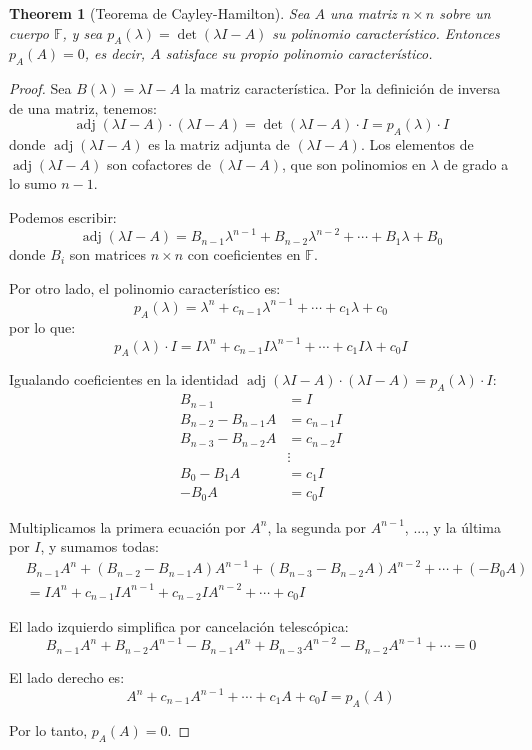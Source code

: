 \documentclass[11pt,a4paper]{article}
\theoremstyle{plain}
\newtheorem{theorem}{Theorem}[section]
\theoremstyle{definition}
\begin{document}
\begin{theorem}[Teorema de Cayley-Hamilton]
Sea $A$ una matriz $n \times n$ sobre un cuerpo $\mathbb{F}$, y sea $p_A(\lambda) = \det(\lambda I - A)$ su polinomio característico. Entonces $p_A(A) = 0$, es decir, $A$ satisface su propio polinomio característico.
\end{theorem}

\begin{proof}
Sea $B(\lambda) = \lambda I - A$ la matriz característica. Por la definición de inversa de una matriz, tenemos:
\[
\operatorname{adj}(\lambda I - A) \cdot (\lambda I - A) = \det(\lambda I - A) \cdot I = p_A(\lambda) \cdot I
\]
donde $\operatorname{adj}(\lambda I - A)$ es la matriz adjunta de $(\lambda I - A)$. Los elementos de $\operatorname{adj}(\lambda I - A)$ son cofactores de $(\lambda I - A)$, que son polinomios en $\lambda$ de grado a lo sumo $n-1$.

Podemos escribir:
\[
\operatorname{adj}(\lambda I - A) = B_{n-1} \lambda^{n-1} + B_{n-2} \lambda^{n-2} + \cdots + B_1 \lambda + B_0
\]
donde $B_i$ son matrices $n \times n$ con coeficientes en $\mathbb{F}$.

Por otro lado, el polinomio característico es:
\[
p_A(\lambda) = \lambda^n + c_{n-1} \lambda^{n-1} + \cdots + c_1 \lambda + c_0
\]
por lo que:
\[
p_A(\lambda) \cdot I = I \lambda^n + c_{n-1} I \lambda^{n-1} + \cdots + c_1 I \lambda + c_0 I
\]

Igualando coeficientes en la identidad $\operatorname{adj}(\lambda I - A) \cdot (\lambda I - A) = p_A(\lambda) \cdot I$:
\begin{align*}
B_{n-1} &= I \\
B_{n-2} - B_{n-1} A &= c_{n-1} I \\
B_{n-3} - B_{n-2} A &= c_{n-2} I \\
&\vdots \\
B_0 - B_1 A &= c_1 I \\
-B_0 A &= c_0 I
\end{align*}

Multiplicamos la primera ecuación por $A^n$, la segunda por $A^{n-1}$, ..., y la última por $I$, y sumamos todas:
\begin{align*}
&B_{n-1} A^n + (B_{n-2} - B_{n-1} A) A^{n-1} + (B_{n-3} - B_{n-2} A) A^{n-2} + \cdots + (-B_0 A) \\
&= I A^n + c_{n-1} I A^{n-1} + c_{n-2} I A^{n-2} + \cdots + c_0 I
\end{align*}

El lado izquierdo simplifica por cancelación telescópica:
\[
B_{n-1} A^n + B_{n-2} A^{n-1} - B_{n-1} A^n + B_{n-3} A^{n-2} - B_{n-2} A^{n-1} + \cdots = 0
\]

El lado derecho es:
\[
A^n + c_{n-1} A^{n-1} + \cdots + c_1 A + c_0 I = p_A(A)
\]

Por lo tanto, $p_A(A) = 0$.
\end{proof}
\end{document}
